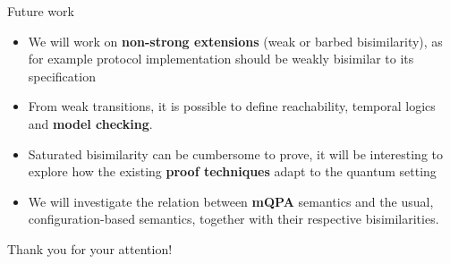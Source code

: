 \documentclass{beamer}
\begin{document}
\begin{frame}{Future work}
\begin{itemize}
\item<1-> We will work on \textbf{non-strong extensions} (weak or barbed bisimilarity), as for example protocol implementation should be weakly bisimilar to its specification
\item<2->  From weak transitions, it is possible to define reachability, temporal logics and \textbf{model checking}.
\item<3->  Saturated bisimilarity can be cumbersome to prove, it will be interesting to explore how the existing \textbf{proof techniques} adapt to the quantum setting
\item<4->  We will investigate the relation between \textbf{mQPA} semantics and the usual, configuration-based semantics, together with their respective bisimilarities.
\end{itemize}
\end{frame}

\begin{frame}
\bigskip
\begin{Large}
\begin{center}
Thank you for your attention!
\end{center}
\end{Large}
\end{frame}
\end{document}
